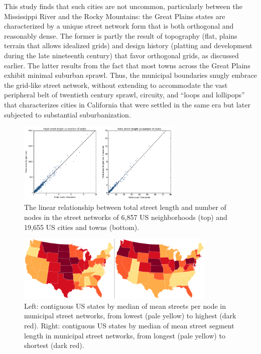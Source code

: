 \documentclass{article}
\begin{document}
This study finds that such cities are not uncommon, particularly between the Mississippi River and the Rocky Mountains: the Great Plains states are characterized by a unique street network form that is both orthogonal and reasonably dense. The former is partly the result of topography (flat, plains terrain that allows idealized grids) and design history (platting and development during the late nineteenth century) that favor orthogonal grids, as discussed earlier. The latter results from the fact that most towns across the Great Plains exhibit minimal suburban sprawl. Thus, the municipal boundaries snugly embrace the grid-like street network, without extending to accommodate the vast peripheral belt of twentieth century sprawl, circuity, and \enquote{loops and lollipops} \cite{southworth_streets_1997} that characterizes cities in California that were settled in the same era but later subjected to substantial suburbanization.

\begin{figure}
	\includegraphics[width=0.7\textwidth]{media/fig03.png}
	\caption{The linear relationship between total street length and number of nodes in the street networks of 6,857 US neighborhoods (top) and 19,655 US cities and towns (bottom).}
	\label{fig03}
\end{figure}

\begin{figure}
	\includegraphics[width=0.85\textwidth]{media/fig04.png}
	\caption{Left: contiguous US states by median of mean streets per node in municipal street networks, from lowest (pale yellow) to highest (dark red). Right: contiguous US states by median of mean street segment length in municipal street networks, from longest (pale yellow) to shortest (dark red).}
	\label{fig04}
\end{figure}
\end{document}
